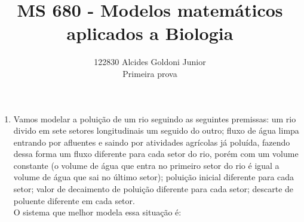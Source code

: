 \documentclass[a4paper]{article}
\title{MS 680 - Modelos matem\'{a}ticos aplicados a Biologia}
\author{122830 Alcides Goldoni Junior\\
  \Small Primeira prova \\
}%
\begin{document}
\maketitle
\begin{enumerate}
\item
Vamos modelar a polui\c{c}\~ao de um rio seguindo as seguintes premissas: um rio divido em sete setores longitudinais um seguido do outro; fluxo de \'agua limpa entrando por afluentes e saindo por atividades agr\'icolas j\'a polu\'ida, fazendo dessa forma um fluxo diferente para cada setor do rio, por\'em com um volume constante (o volume de \'agua que entra no primeiro setor do rio \'e igual a volume de \'agua que sai no \'ultimo setor); polui\c{c}\~ao inicial diferente para cada setor; valor de decaimento de polui\c{c}\~ao diferente para cada setor; descarte de poluente diferente em cada setor.
\\
O sistema que melhor modela essa situa\c{c}\~ao \'e:
\begin{equation}

\end{equation}
\\


\end{enumerate}
\end{document}
